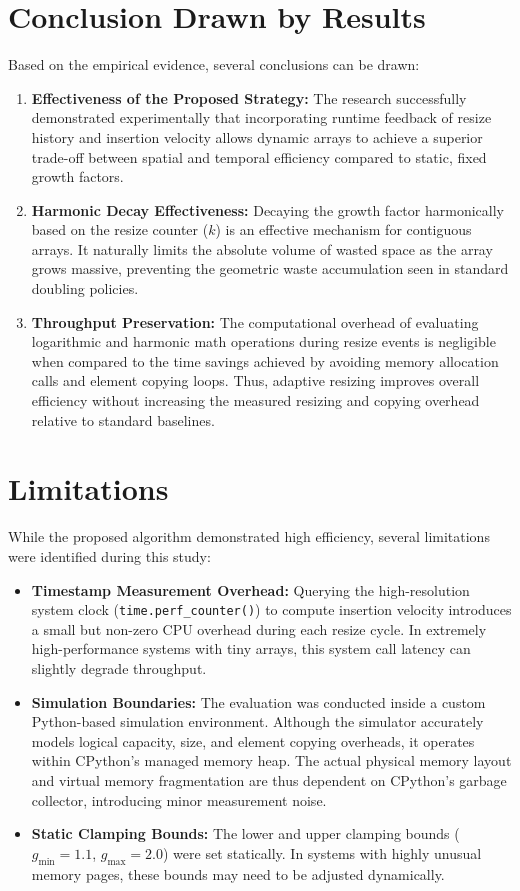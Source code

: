 \section{Conclusion Drawn by Results}
Based on the empirical evidence, several conclusions can be drawn:
\begin{enumerate}
    \item \textbf{Effectiveness of the Proposed Strategy:} The research successfully 
    demonstrated experimentally that incorporating runtime feedback of resize history 
    and insertion velocity allows dynamic arrays to achieve a superior trade-off 
    between spatial and temporal efficiency compared to static, fixed growth 
    factors.
    \item \textbf{Harmonic Decay Effectiveness:} Decaying the growth 
    factor harmonically based on the resize counter ($k$) is an effective 
    mechanism for contiguous arrays. It naturally limits the absolute volume of 
    wasted space as the array grows massive, preventing the geometric waste 
    accumulation seen in standard doubling policies.
    \item \textbf{Throughput Preservation:} The computational overhead of evaluating 
    logarithmic and harmonic math operations during resize events is negligible 
    when compared to the time savings achieved by avoiding memory allocation 
    calls and element copying loops. Thus, adaptive resizing improves overall 
    efficiency without increasing the measured resizing and copying overhead relative to standard baselines.
\end{enumerate}

\section{Limitations}
While the proposed algorithm demonstrated high efficiency, several limitations 
were identified during this study:
\begin{itemize}
    \item \textbf{Timestamp Measurement Overhead:} Querying the high-resolution 
    system clock (\texttt{time.perf\_counter()}) to compute insertion velocity 
    introduces a small but non-zero CPU overhead during each resize cycle. In 
    extremely high-performance systems with tiny arrays, this system call latency 
    can slightly degrade throughput.
    \item \textbf{Simulation Boundaries:} The evaluation was conducted inside 
    a custom Python-based simulation environment. Although the simulator accurately 
    models logical capacity, size, and element copying overheads, it operates 
    within CPython's managed memory heap. The actual physical memory layout and 
    virtual memory fragmentation are thus dependent on CPython's garbage collector, 
    introducing minor measurement noise.
    \item \textbf{Static Clamping Bounds:} The lower and upper clamping bounds 
    ($g_{\min} = 1.1$, $g_{\max} = 2.0$) were set statically. In systems with 
    highly unusual memory pages, these bounds may need to be adjusted dynamically.
\end{itemize}

